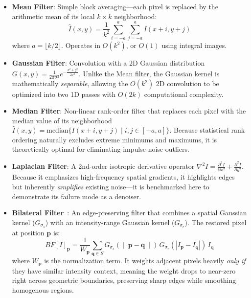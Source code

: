 \documentclass[a4paper,12pt]{article}
\begin{document}
\begin{itemize}
    \item \textbf{Mean Filter}: Simple block averaging---each pixel is replaced by the arithmetic mean of its local $k \times k$ neighborhood:
    \begin{equation}
        \hat{I}(x,y) = \frac{1}{k^2} \sum_{i=-a}^{a} \sum_{j=-a}^{a} I(x+i, y+j)
    \end{equation}
    where $a = \lfloor k/2 \rfloor$. Operates in $O(k^2)$, or $O(1)$ using integral images.

    \item \textbf{Gaussian Filter}: Convolution with a 2D Gaussian distribution $G(x,y) = \frac{1}{2\pi\sigma^2}e^{-\frac{x^2+y^2}{2\sigma^2}}$. Unlike the Mean filter, the Gaussian kernel is mathematically \textit{separable}, allowing the $O(k^2)$ 2D convolution to be optimized into two 1D passes with $O(2k)$ computational complexity.

    \item \textbf{Median Filter}: Non-linear rank-order filter that replaces each pixel with the median value of its neighborhood $\hat{I}(x,y) = \text{median}\{I(x+i, y+j) \mid i,j \in [-a, a]\}$. Because statistical rank ordering naturally excludes extreme minimums and maximums, it is theoretically optimal for eliminating impulse noise outliers.

    \item \textbf{Laplacian Filter}: A 2nd-order isotropic derivative operator $\nabla^2 I = \frac{\partial^2 I}{\partial x^2} + \frac{\partial^2 I}{\partial y^2}$. Because it emphasizes high-frequency spatial gradients, it highlights edges but inherently \textit{amplifies} existing noise---it is benchmarked here to demonstrate its failure mode as a denoiser.

    \item \textbf{Bilateral Filter}~\cite{tomasi1998bilateral}: An edge-preserving filter that combines a spatial Gaussian kernel ($G_{\sigma_s}$) with an intensity-range Gaussian kernel ($G_{\sigma_r}$). The restored pixel at position $\mathbf{p}$ is:
    \begin{equation}
        BF[I]_\mathbf{p} = \frac{1}{W_\mathbf{p}} \sum_{\mathbf{q} \in S} G_{\sigma_s}(\|\mathbf{p} - \mathbf{q}\|) \, G_{\sigma_r}(|I_\mathbf{p} - I_\mathbf{q}|) \, I_\mathbf{q}
    \end{equation}
    where $W_\mathbf{p}$ is the normalization term. It weights adjacent pixels heavily \textit{only if} they have similar intensity context, meaning the weight drops to near-zero right across geometric boundaries, preserving sharp edges while smoothing homogenous regions.
\end{itemize}
\end{document}
